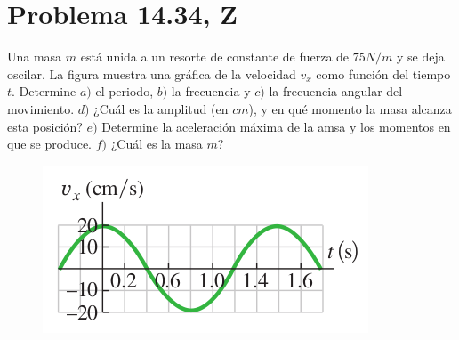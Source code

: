 \section*{Problema 14.34, Z}

\noindent Una masa $m$ está unida a un resorte de constante de fuerza de $75N/m$ y se deja oscilar. La figura muestra una gráfica de la velocidad $v_x$  como función del tiempo $t$. Determine $a)$ el periodo, $b)$ la frecuencia y $c)$ la frecuencia angular del movimiento. $d)$ ¿Cuál es la amplitud (en $cm$), y en qué momento la masa alcanza esta posición? $e)$ Determine la aceleración máxima de la amsa y los momentos en que se produce. $f)$ ¿Cuál es la masa $m$?

\begin{figure}[H]
	\centering
	\includegraphics[scale=0.6]{./img/graph.png}
\end{figure}

